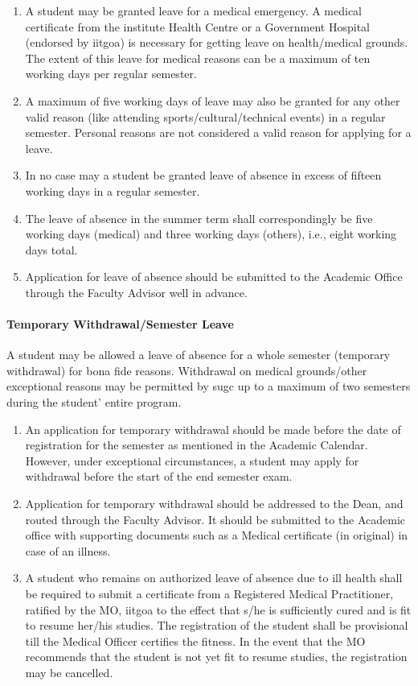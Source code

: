 \begin{enumerate}[leftmargin=15mm]
    \item A \gls{student} may be granted leave for a medical emergency. A medical certificate from the institute Health Centre or a Government Hospital (endorsed by \acrshort{iitgoa}) is necessary for getting leave on health/medical grounds. The extent of this leave for medical reasons can be a maximum of ten working days per regular semester. 
    \item A maximum of five working days of leave may also be granted for any other valid reason (like attending sports/cultural/technical events) in a regular semester. Personal reasons are not considered a valid reason for applying for a leave.
    \item In no case may a \gls{student} be granted leave of absence in excess of fifteen working days in a regular semester. 
    \item The leave of absence in the summer term shall correspondingly be five working days (medical) and three working days (others), i.e., eight working days total. 
    \item Application for leave of absence should be submitted to the Academic Office through the Faculty Advisor well in advance.
\end{enumerate}

\paragraph{Temporary Withdrawal/Semester Leave} A \gls{student} may be allowed a leave of absence for a whole semester (temporary withdrawal) for bona fide reasons. Withdrawal on medical grounds/other exceptional reasons may be permitted by \acrshort{sugc} up to a maximum of two semesters during the \gls{student}' entire program.

\begin{enumerate}[leftmargin=15mm, resume]
    \item An application for temporary withdrawal should be made before the date of registration for the semester as mentioned in the Academic Calendar. However, under exceptional circumstances, a \gls{student} may apply for withdrawal before the start of the end semester exam.
    \item Application for temporary withdrawal should be addressed to the Dean, and routed through the Faculty Advisor. It should be submitted to the Academic office with supporting documents such as a Medical certificate (in original) in case of an illness. 
    \item A \gls{student} who remains on authorized leave of absence due to ill health shall be required to submit a certificate from a Registered Medical Practitioner, ratified by the MO, \acrshort{iitgoa} to the effect that s/he is sufficiently cured and is fit to resume her/his studies. The registration of the \gls{student} shall be provisional till the Medical Officer certifies the fitness. In the event that the MO recommends that the \gls{student} is not yet fit to resume studies, the registration may be cancelled.
\end{enumerate}


